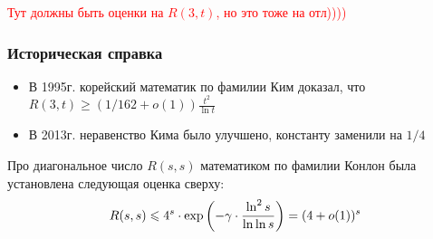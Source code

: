 \textcolor{red}{Тут должны быть оценки на $R(3, t)$, но это тоже на отл))))}

\subsubsection*{Историческая справка}

\begin{itemize}
	\item В 1995г. корейский математик по фамилии Ким доказал, что \(R(3, t) \ge (1 / 162 + o(1))\frac{t^2}{\ln t}\)
	
	\item В 2013г. неравенство Кима было улучшено, константу заменили на $1 / 4$
\end{itemize}

Про диагональное число $R(s, s)$ математиком по фамилии Конлон была установлена следующая оценка сверху:
\[
	R(s, s) \leqslant 4^s \cdot \exp\left(-\gamma \cdot \frac{\ln^2 s}{\ln\ln s}\right) = (4 + o(1))^s
\]